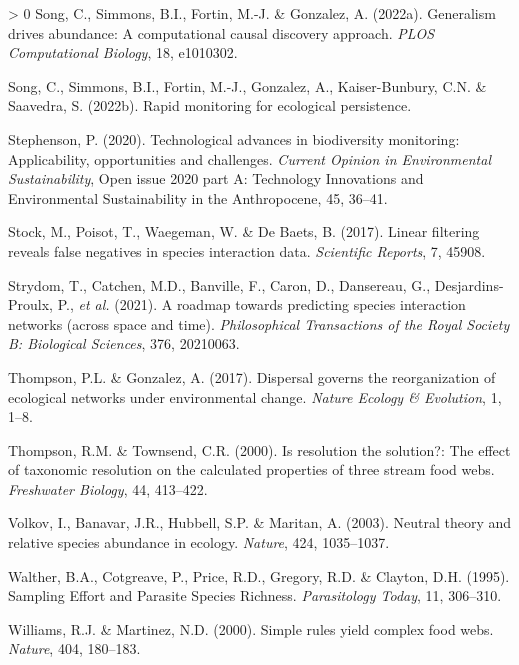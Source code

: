 \documentclass[11pt]{article}
\newlength{\cslhangindent}
\newenvironment{CSLReferences}[3] %
 {%
  \setlength{\parindent}{0pt}
  \ifodd #1 \everypar{\setlength{\hangindent}{\cslhangindent}}\ignorespaces\fi
  \ifnum #2 > 0
  \setlength{\parskip}{#2\baselineskip}
  \fi
 }%
 {}
\begin{document}
\begin{CSLReferences}{1}{0}
\leavevmode\hypertarget{ref-Song2022GenDri}{}%
Song, C., Simmons, B.I., Fortin, M.-J. \& Gonzalez, A. (2022a).
Generalism drives abundance: A computational causal discovery approach.
\emph{PLOS Computational Biology}, 18, e1010302.

\leavevmode\hypertarget{ref-Song2022RapMon}{}%
Song, C., Simmons, B.I., Fortin, M.-J., Gonzalez, A., Kaiser-Bunbury,
C.N. \& Saavedra, S. (2022b). Rapid monitoring for ecological
persistence.

\leavevmode\hypertarget{ref-Stephenson2020TecAdv}{}%
Stephenson, P. (2020). Technological advances in biodiversity
monitoring: Applicability, opportunities and challenges. \emph{Current
Opinion in Environmental Sustainability}, Open issue 2020 part A:
Technology Innovations and Environmental Sustainability in the
Anthropocene, 45, 36--41.

\leavevmode\hypertarget{ref-Stock2017LinFil}{}%
Stock, M., Poisot, T., Waegeman, W. \& De Baets, B. (2017). Linear
filtering reveals false negatives in species interaction data.
\emph{Scientific Reports}, 7, 45908.

\leavevmode\hypertarget{ref-Strydom2021RoaPre}{}%
Strydom, T., Catchen, M.D., Banville, F., Caron, D., Dansereau, G.,
Desjardins-Proulx, P., \emph{et al.} (2021). A roadmap towards
predicting species interaction networks (across space and time).
\emph{Philosophical Transactions of the Royal Society B: Biological
Sciences}, 376, 20210063.

\leavevmode\hypertarget{ref-Thompson2017DisGov}{}%
Thompson, P.L. \& Gonzalez, A. (2017). Dispersal governs the
reorganization of ecological networks under environmental change.
\emph{Nature Ecology \& Evolution}, 1, 1--8.

\leavevmode\hypertarget{ref-Thompson2000ResSol}{}%
Thompson, R.M. \& Townsend, C.R. (2000). Is resolution the solution?:
The effect of taxonomic resolution on the calculated properties of three
stream food webs. \emph{Freshwater Biology}, 44, 413--422.

\leavevmode\hypertarget{ref-Volkov2003NeuThe}{}%
Volkov, I., Banavar, J.R., Hubbell, S.P. \& Maritan, A. (2003). Neutral
theory and relative species abundance in ecology. \emph{Nature}, 424,
1035--1037.

\leavevmode\hypertarget{ref-Walther1995SamEff}{}%
Walther, B.A., Cotgreave, P., Price, R.D., Gregory, R.D. \& Clayton,
D.H. (1995). Sampling Effort and Parasite Species Richness.
\emph{Parasitology Today}, 11, 306--310.

\leavevmode\hypertarget{ref-Williams2000SimRul}{}%
Williams, R.J. \& Martinez, N.D. (2000). Simple rules yield complex food
webs. \emph{Nature}, 404, 180--183.


\end{CSLReferences}
\end{document}

